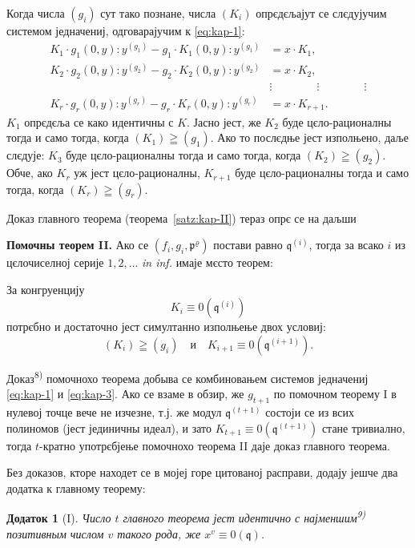 \documentclass[11pt]{article}
\theoremstyle{plain}
\newtheorem{zusatz}{Додаток}
\begin{document}
Когда числа $(g_{i})$ сут тако познане, числа $(K_{i})$ опрєдєљајут
се слєдујучим системом једначениј, одговарајучим к \eqref{eq:kap-1}:
\begin{equation}\label{eq:kap-3}
\begin{aligned}
K_1\cdot g_1(0,y):y^{(g_1)} - g_1\cdot K_1(0,y):y^{(g_1)} &= x\cdot K_1,\\
K_2\cdot g_2(0,y):y^{(g_2)} - g_2\cdot K_2(0,y):y^{(g_2)} &= x\cdot K_2,\\
&\vdots \qquad\qquad\vdots\qquad\qquad\vdots\\
K_{r}\cdot g_{r}(0,y):y^{(g_{r})} - g_{r}\cdot K_{r}(0,y):y^{(g_{r})} &= x\cdot K_{r+1}.
\end{aligned}
\end{equation}
$K_{1}$ опрєдєља се како идентичны с $K$. Јасно јест, же $K_{2}$
буде цєло-рационалны тогда и само тогда, когда
$(K_1)\geqq(g_1)$. Ако то послєдње јест изполњено, даље
слєдује: $K_{3}$ буде цєло-рационалны тогда и само тогда, когда
$(K_2)\geqq(g_2)$. Обче, ако $K_{r}$ уж јест цєло-рационалны,
$K_{r+1}$ буде цєло-рационалны тогда и само тогда, когда
$(K_r)\geqq(g_r)$.

Доказ главного теорема (теорема~\ref{satz:kap-II}) тераз опрє се на
даљши

\smallskip
\textbf{Помочны теорем II.} Ако се
$(f_i,g_i,\mathfrak{p}^\varrho)$ постави равно
$\mathfrak{q}^{(i)}$, тогда за всако $i$ из цєлочиселној серије
$1, 2, \ldots$ \textit{in inf.} имаје мєсто теорем:

За конгруенцију
\[
K_{i} \equiv 0(\mathfrak{q}^{(i)})
\]
потрєбно и достаточно јест симултанно изполњење двох условиј:
\[
(K_i)\geqq(g_i)\quad \text{и}\quad K_{i+1}\equiv0(\mathfrak{q}^{(i+1)}).
\]

Доказ\textsuperscript{8)} помочнохо теорема добыва се комбиновањем
системов једначениј \eqref{eq:kap-1} и \eqref{eq:kap-3}. Ако се
взаме в обзир, же $g_{t+1}$ по помочном теорему I в нулевој точце вече не
изчезне, т.ј. же модул $\mathfrak{q}^{(t+1)}$ состоји се из всих
полиномов (јест јединичны идеал), и зато
$K_{t+1} \equiv 0(\mathfrak{q}^{(t+1)})$ стане тривиално, тогда
$t$-кратно употрєбјење помочнохо теорема II даје доказ главного
теорема.

\smallskip
Без доказов, кторе находет се в мојеј горе цитованој расправи,
додају јешче два додатка к главному теорему:

\begin{zusatz}[I]
Число $t$ главного теорема јест идентично с најменшим\textsuperscript{9)}
позитивным числом $v$ такого рода, же
$x^{v} \equiv 0(\mathfrak{q})$.
\end{zusatz}
\end{document}
